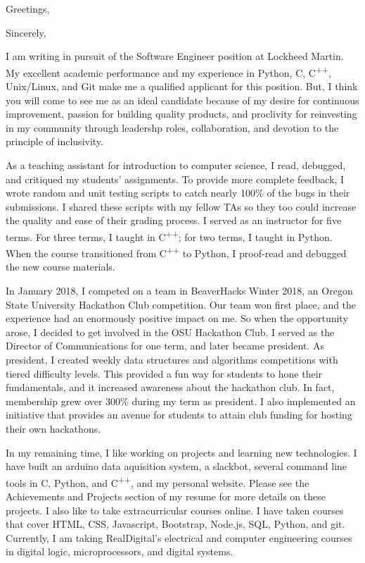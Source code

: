 \documentclass[11pt,a4paper,roman]{moderncv}        %
\begin{document}
\date{April 12, 2020}
\opening{Greetings,}
\closing{Sincerely,}
\makelettertitle

I am writing in pursuit of the Software Engineer position at Lockheed Martin. My excellent academic performance and my experience in Python, C, C\textsuperscript{++}, Unix/Linux, and Git make me a qualified applicant for this position. But, I think you will come to see me as an ideal candidate because of my desire for continuous improvement, passion for building quality products, and proclivity for reinvesting in my community through leadershp roles, collaboration, and devotion to the principle of inclusivity.

As a teaching assistant for introduction to computer science, I read, debugged, and critiqued my students' assignments. To provide more complete feedback, I wrote random and unit testing scripts to catch nearly 100\% of the bugs in their submissions. I shared these scripts with my fellow TAs so they too could increase the quality and ease of their grading process. I served as an instructor for five terms. For three terms, I taught in C\textsuperscript{++}; for two terms, I taught in Python. When the course transitioned from C\textsuperscript{++} to Python, I proof-read and debugged the new course materials. 

In January 2018, I competed on a team in BeaverHacks Winter 2018, an Oregon State University Hackathon Club competition. Our team won first place, and the experience had an enormously positive impact on me. So when the opportunity arose, I decided to get involved in the OSU Hackathon Club. I served as the Director of Communications for one term, and later became president. As president, I created weekly data structures and algorithms competitions with tiered difficulty levels. This provided a fun way for students to hone their fundamentals, and it increased awareness about the hackathon club. In fact, membership grew over 300\% during my term as president. I also implemented an initiative that provides an avenue for students to attain club funding for hosting their own hackathons.

In my remaining time, I like working on projects and learning new technologies. I have built an arduino data aquisition system, a slackbot, several command line tools in C, Python, and C\textsuperscript{++}, and my personal website. Please see the Achievements and Projects section of my resume for more details on these projects. I also like to take extracurricular courses online. I have taken courses that cover HTML, CSS, Javascript, Bootstrap, Node.js, SQL, Python, and git. Currently, I am taking RealDigital's electrical and computer engineering courses in digital logic, microprocessors, and digital systems.
\end{document}
